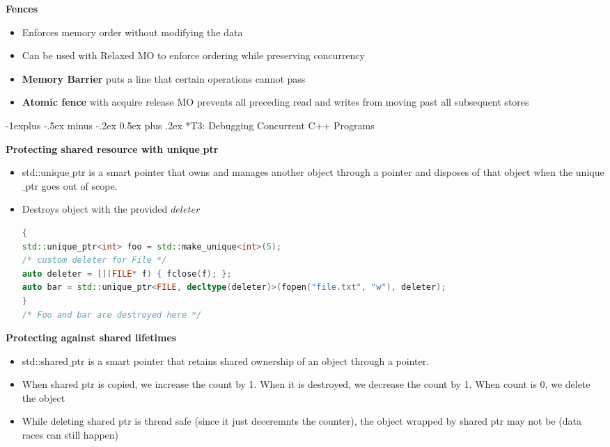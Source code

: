 \documentclass[10pt, landscape]{article}
\makeatletter
\renewcommand{\subsection}{\@startsection{subsection}{2}{0mm}%
                                {-1explus -.5ex minus -.2ex}%
                                {0.5ex plus .2ex}%
                                {\normalfont\normalsize\bfseries}}
\makeatother
\begin{document}
\begin{multicols}{4}
\textbf{Fences} \\
\begin{itemize}
    \item Enforces memory order without modifying the data 
    \item Can be used with Relaxed MO to enforce ordering while preserving concurrency 
    \item \textbf{Memory Barrier} puts a line that certain operations cannot pass 
    \item \textbf{Atomic fence} with acquire release MO prevents all preceding read and writes from moving past all subsequent stores
\end{itemize}

\subsection*{T3: Debugging Concurrent C++ Programs}

\textbf{Protecting shared resource with unique$\_$ptr} \\
\begin{itemize}
    \item std::unique$\_$ptr is a smart pointer that owns and manages another object through a pointer and disposes of that object when the unique$\_$ptr goes out of scope.
    \item Destroys object with the provided $deleter$
    \begin{lstlisting}[language=C++, breaklines=true, breakatwhitespace=true]
{ 
std::unique_ptr<int> foo = std::make_unique<int>(5);
/* custom deleter for File */
auto deleter = [](FILE* f) { fclose(f); };
auto bar = std::unique_ptr<FILE, decltype(deleter)>(fopen("file.txt", "w"), deleter);
}
/* Foo and bar are destroyed here */
    \end{lstlisting}
\end{itemize}

\textbf{Protecting against shared lifetimes} \\
\begin{itemize}
    \item std::shared$\_$ptr is a smart pointer that retains shared ownership of an object through a pointer.
    \item When shared ptr is copied, we increase the count by 1. When it is destroyed, we decrease the count by 1. When count is 0, we delete the object
    \item While deleting shared ptr is thread safe (since it just deceremnts the counter), the object wrapped by shared ptr may not be (data races can still happen)
\end{itemize}


\end{multicols}
\end{document}
